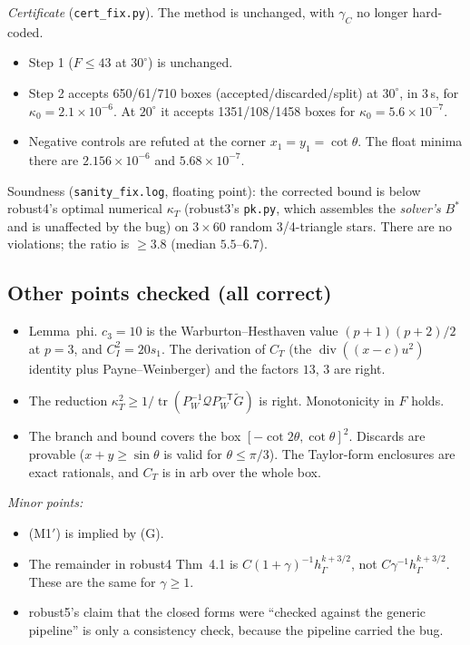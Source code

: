 \documentclass[11pt]{article}
\theoremstyle{remark}
\newcommand{\hG}{h_\Gamma}
\begin{document}
\noindent\emph{Certificate} (\texttt{cert\_fix.py}). The method is unchanged, with $\gamma_C$ no longer hard-coded.
\begin{itemize}
\item Step 1 ($F\le43$ at $30^\circ$) is unchanged.
\item Step 2 accepts 650/61/710 boxes (accepted/discarded/split) at $30^\circ$, in 3\,s, for $\kappa_0=2.1\times10^{-6}$. At $20^\circ$ it accepts 1351/108/1458 boxes for
$\kappa_0=5.6\times10^{-7}$.
\item Negative controls are refuted at the corner $x_1=y_1=\cot\theta$. The float minima there are $2.156\times10^{-6}$ and $5.68\times10^{-7}$.
\end{itemize}
Soundness (\texttt{sanity\_fix.log}, floating point): the corrected bound is below robust4's optimal numerical $\kappa_T$ (robust3's \texttt{pk.py}, which
assembles the \emph{solver's} $B^\ast$ and is unaffected by the bug) on $3\times60$ random 3/4-triangle stars. There are no violations; the
ratio is $\ge3.8$ (median $5.5$--$6.7$).

\subsection{Other points checked (all correct)}
\begin{itemize}
\item Lemma~phi. $c_3=10$ is the Warburton--Hesthaven value $(p+1)(p+2)/2$ at $p=3$, and $C_I^2=20s_1$. The derivation of $C_T$
(the $\operatorname{div}((x-c)u^2)$ identity plus Payne--Weinberger) and the factors $13$, $3$ are right.
\item The reduction $\kappa_T^2\ge1/\operatorname{tr}(P_W^{-1}\mathcal QP_W^{-\mathsf T}\tilde G)$ is right. Monotonicity in $F$ holds.
\item The branch and bound covers the box $[-\cot2\theta,\cot\theta]^2$. Discards are provable ($x+y\ge\sin\theta$ is valid for $\theta\le\pi/3$). The Taylor-form
enclosures are exact rationals, and $C_T$ is in arb over the whole box.
\end{itemize}
\emph{Minor points:}
\begin{itemize}
\item (M1$'$) is implied by (G).
\item The remainder in robust4 Thm~4.1 is $C(1+\gamma)^{-1}\hG^{k+3/2}$, not $C\gamma^{-1}\hG^{k+3/2}$. These are the same for $\gamma\ge1$.
\item robust5's claim that the closed forms were ``checked against the generic pipeline'' is only a consistency check, because the pipeline carried the bug.
\end{itemize}
\end{document}
